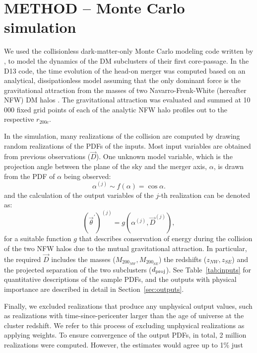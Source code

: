 \documentclass[letterpaper,useAMS,usenatbib]{mn2e}
\begin{document}
\section{METHOD -- Monte Carlo simulation} 
\label{sec:method}
We used the collisionless 
dark-matter-only Monte Carlo modeling code written by , to
model the dynamics of the DM subclusters of their first core-passage.
In the D13 code, the time evolution of the
head-on merger was computed based on an analytical, dissipationless model
assuming that the only dominant force is the gravitational attraction from
the masses of two Navarro-Frenk-White (hereafter NFW) DM halos
\citep{Navarro96}. 
The gravitational attraction was evaluated and summed at 10 000 fixed grid
points of each of the analytic NFW halo profiles out to the respective
$r_{200c}$.\par
In the simulation, many realizations of the collision are
computed by drawing random realizations of the PDFs of the inputs. Most
input variables are obtained from previous observations ($\vec{D}$).  One
unknown model variable, which is the projection angle between the plane of the sky
and the merger axis, $\alpha$, is drawn from the PDF of $\alpha$ being
observed: 
\begin{equation}
	\alpha^{(j)} \sim f(\alpha) = \cos \alpha.
\end{equation}
and the calculation of the output variables of the $j$-th realization can be denoted as: 
\begin{equation}
	(\vec{\theta}^\prime)^{(j)} = g(\alpha^{(j)}, \vec{D}^{(j)}), 
\end{equation}    
for a suitable function $g$ that describes conservation of energy during
the collision of the two NFW halos due to the mutual gravitational
attraction.  In particular, the required $\vec{D}$ includes the masses ($M_{200_{NW}},M_{200_{SE}}$) the redshifts ($z_{NW}, z_{SE}$) and the
projected separation of the two subclusters ($d_{\rm proj}$).  See
Table~\ref{tab:inputs} for quantitative descriptions of the sample PDFs, and
the outputs with physical importance are described in detail in Section~\ref{sec:outputs}. \par
Finally, we excluded realizations that produce any unphysical output
values, such as realizations with time-since-pericenter larger than the age of universe at the
cluster redshift.  We refer to this process of excluding unphysical
realizations as applying weights. 
To ensure convergence of the output PDFs, in total, 2 million realizations
were computed. However, the estimates would agree up to 1\% just 
\end{document}
